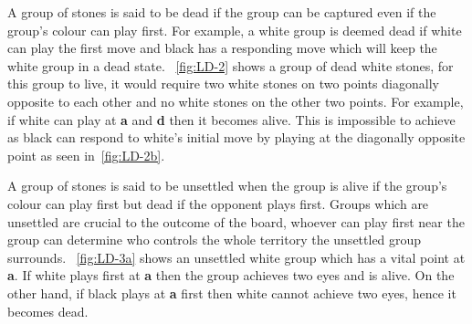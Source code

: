 \documentclass{l4proj}
\newcommand{\bo}[1]{\textbf{#1}}
\begin{document}
A group of stones is said to be dead if the group can be captured even if the group’s colour can play first. For example, a white group is deemed dead if white can play the first move and black has a responding move which will keep the white group in a dead state. ~\autoref{fig:LD-2} shows a group of dead white stones, for this group to live, it would require two white stones on two points diagonally opposite to each other and no white stones on the other two points. For example, if white can play at \bo{a} and \bo{d} then it becomes alive. This is impossible to achieve as black can respond to white’s initial move by playing at the diagonally opposite point as seen in~\autoref{fig:LD-2b}.


A group of stones is said to be unsettled when the group is alive if the group’s colour can play first but dead if the opponent plays first. Groups which are unsettled are crucial to the outcome of the board, whoever can play first near the group can determine who controls the whole territory the unsettled group surrounds. ~\autoref{fig:LD-3a} shows an unsettled white group which has a vital point at \bo{a}. If white plays first at \bo{a} then the group achieves two eyes and is alive. On the other hand, if black plays at \bo{a} first then white cannot achieve two eyes, hence it becomes dead.
\end{document}
